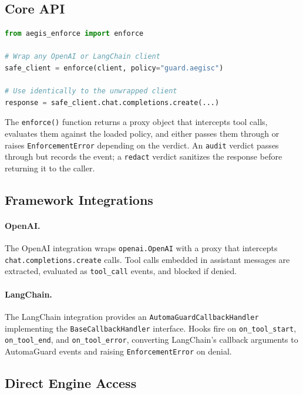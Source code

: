 \documentclass[sigconf]{acmart}
\begin{document}
\subsection{Core API}

\begin{lstlisting}[language=Python,caption={Drop-in enforcement with three lines.},label={lst:sdk}]
from aegis_enforce import enforce

# Wrap any OpenAI or LangChain client
safe_client = enforce(client, policy="guard.aegisc")

# Use identically to the unwrapped client
response = safe_client.chat.completions.create(...)
\end{lstlisting}

The \texttt{enforce()} function returns a proxy object that intercepts tool
calls, evaluates them against the loaded policy, and either passes them through
or raises \texttt{EnforcementError} depending on the verdict. An \texttt{audit}
verdict passes through but records the event; a \texttt{redact} verdict
sanitizes the response before returning it to the caller.

\subsection{Framework Integrations}

\paragraph{OpenAI.}
The OpenAI integration wraps \texttt{openai.OpenAI} with a proxy that
intercepts \texttt{chat.completions.create} calls. Tool calls embedded in
assistant messages are extracted, evaluated as \texttt{tool\_call} events,
and blocked if denied.

\paragraph{LangChain.}
The LangChain integration provides an \texttt{AutomaGuardCallbackHandler}
implementing the \texttt{BaseCallbackHandler} interface. Hooks fire on
\texttt{on\_tool\_start}, \texttt{on\_tool\_end}, and \texttt{on\_tool\_error},
converting LangChain's callback arguments to AutomaGuard events and raising
\texttt{EnforcementError} on denial.

\subsection{Direct Engine Access}
\end{document}
